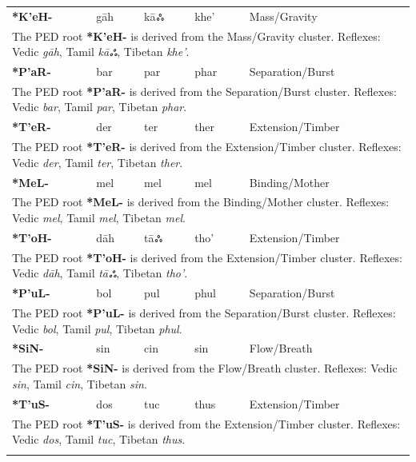 \begin{longtable}{p{} p{} p{} p{} p{}}
\textbf{*K'eH-} & gāh & kāஃ & khe' & Mass/Gravity \\ 
\multicolumn{5}{p{\textwidth}}{\small The PED root \textbf{*K'eH-} is derived from the Mass/Gravity cluster. Reflexes: Vedic \textit{gāh}, Tamil \textit{kāஃ}, Tibetan \textit{khe'}. } \\ \addlinespace 
\textbf{*P'aR-} & bar & par & phar & Separation/Burst \\ 
\multicolumn{5}{p{\textwidth}}{\small The PED root \textbf{*P'aR-} is derived from the Separation/Burst cluster. Reflexes: Vedic \textit{bar}, Tamil \textit{par}, Tibetan \textit{phar}. } \\ \addlinespace 
\textbf{*T'eR-} & der & ter & ther & Extension/Timber \\ 
\multicolumn{5}{p{\textwidth}}{\small The PED root \textbf{*T'eR-} is derived from the Extension/Timber cluster. Reflexes: Vedic \textit{der}, Tamil \textit{ter}, Tibetan \textit{ther}. } \\ \addlinespace 
\textbf{*MeL-} & mel & mel & mel & Binding/Mother \\ 
\multicolumn{5}{p{\textwidth}}{\small The PED root \textbf{*MeL-} is derived from the Binding/Mother cluster. Reflexes: Vedic \textit{mel}, Tamil \textit{mel}, Tibetan \textit{mel}. } \\ \addlinespace 
\textbf{*T'oH-} & dāh & tāஃ & tho' & Extension/Timber \\ 
\multicolumn{5}{p{\textwidth}}{\small The PED root \textbf{*T'oH-} is derived from the Extension/Timber cluster. Reflexes: Vedic \textit{dāh}, Tamil \textit{tāஃ}, Tibetan \textit{tho'}. } \\ \addlinespace 
\textbf{*P'uL-} & bol & pul & phul & Separation/Burst \\ 
\multicolumn{5}{p{\textwidth}}{\small The PED root \textbf{*P'uL-} is derived from the Separation/Burst cluster. Reflexes: Vedic \textit{bol}, Tamil \textit{pul}, Tibetan \textit{phul}. } \\ \addlinespace 
\textbf{*SiN-} & sin & cin & sin & Flow/Breath \\ 
\multicolumn{5}{p{\textwidth}}{\small The PED root \textbf{*SiN-} is derived from the Flow/Breath cluster. Reflexes: Vedic \textit{sin}, Tamil \textit{cin}, Tibetan \textit{sin}. } \\ \addlinespace 
\textbf{*T'uS-} & dos & tuc & thus & Extension/Timber \\ 
\multicolumn{5}{p{\textwidth}}{\small The PED root \textbf{*T'uS-} is derived from the Extension/Timber cluster. Reflexes: Vedic \textit{dos}, Tamil \textit{tuc}, Tibetan \textit{thus}. } \\ \addlinespace 

\end{longtable}
